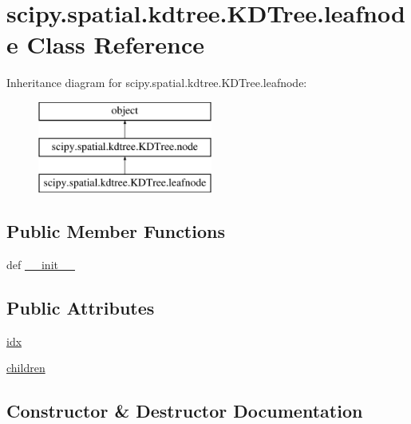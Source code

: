 \hypertarget{classscipy_1_1spatial_1_1kdtree_1_1KDTree_1_1leafnode}{}\section{scipy.\+spatial.\+kdtree.\+K\+D\+Tree.\+leafnode Class Reference}
\label{classscipy_1_1spatial_1_1kdtree_1_1KDTree_1_1leafnode}
Inheritance diagram for scipy.\+spatial.\+kdtree.\+K\+D\+Tree.\+leafnode\+:\begin{figure}[H]
\begin{center}
\leavevmode
\includegraphics[height=3.000000cm]{classscipy_1_1spatial_1_1kdtree_1_1KDTree_1_1leafnode}
\end{center}
\end{figure}
\subsection*{Public Member Functions}
\begin{DoxyCompactItemize}
\item 
def \hyperlink{classscipy_1_1spatial_1_1kdtree_1_1KDTree_1_1leafnode_a8ad930fd51d10a713b0fd3ab8e752446}{\+\_\+\+\_\+init\+\_\+\+\_\+}
\end{DoxyCompactItemize}
\subsection*{Public Attributes}
\begin{DoxyCompactItemize}
\item 
\hyperlink{classscipy_1_1spatial_1_1kdtree_1_1KDTree_1_1leafnode_a76beada5ffb5e3054dd0b2c58b1de536}{idx}
\item 
\hyperlink{classscipy_1_1spatial_1_1kdtree_1_1KDTree_1_1leafnode_acfe8220e50486c1802e01572b37622d1}{children}
\end{DoxyCompactItemize}


\subsection{Constructor \& Destructor Documentation}
\hypertarget{classscipy_1_1spatial_1_1kdtree_1_1KDTree_1_1leafnode_a8ad930fd51d10a713b0fd3ab8e752446}{}
